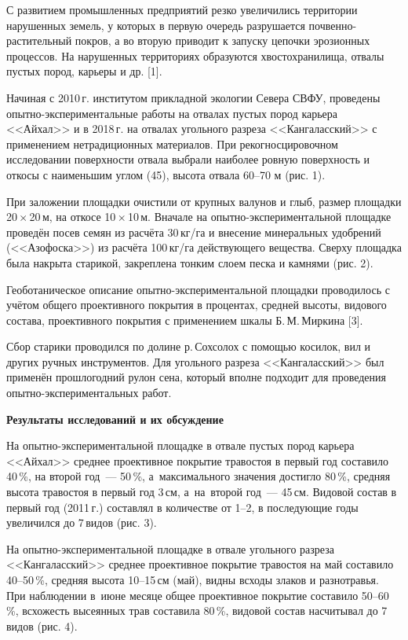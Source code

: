 С развитием промышленных предприятий резко увеличились территории нарушенных земель, у которых в первую очередь разрушается почвенно-растительный покров, а во вторую приводит к запуску цепочки эрозионных процессов. На нарушенных территориях образуются хвостохранилища, отвалы пустых пород, карьеры и др. [1].

Начиная с 2010\,г. институтом прикладной экологии Севера СВФУ, проведены опытно-экспериментальные работы на отвалах пустых пород карьера <<Айхал>> и в 2018\,г. на отвалах угольного разреза <<Кангаласский>> с применением нетрадиционных материалов. При рекогносцировочном исследовании поверхности отвала выбрали наиболее ровную поверхность и откосы с наименьшим углом (45\dg), высота отвала 60--70 м (рис. 1).

При заложении площадки очистили от крупных валунов и глыб, размер площадки 20\,$\times$\,20\,м, на откосе 10\,$\times$\,10\,м. Вначале на опытно-экс\-пе\-ри\-мен\-таль\-ной площадке проведён посев семян из расчёта 30\,кг/га и внесение минеральных удобрений (<<Азофоска>>) из расчёта 100\,кг/га действующего вещества. Сверху площадка была накрыта старикой, закреплена тонким слоем песка и камнями (рис. 2).

Геоботаническое описание опытно-экспериментальной площадки проводилось с учётом общего проективного покрытия в процентах, средней высоты, видового состава, проективного покрытия с применением шкалы Б.\,М.\,Миркина [3].

Сбор старики проводился по долине р.\,Сохсолох с помощью косилок, вил и других ручных инструментов. Для угольного разреза <<Кангаласский>> был применён прошлогодний рулон сена, который вполне подходит для проведения опытно-экспериментальных работ.

\textbf{Результаты исследований и их обсуждение}

На опытно-экспериментальной площадке в отвале пустых пород карьера <<Айхал>> среднее проективное покрытие травостоя в первый год составило 40\,\%, на второй год~--- 50\,\%, а~максимального значения достигло 80\,\%, средняя высота травостоя в первый год 3\,см, а~на~второй год~--- 45\,см. Видовой состав в первый год (2011\,г.) составлял в количестве от 1--2, в последующие годы увеличился до 7\,видов (рис. 3).





На опытно-экспериментальной площадке в отвале угольного разреза <<Кангаласский>> среднее проективное покрытие травостоя на май составило 40--50\,\%, средняя высота 10--15\,см (май), видны всходы злаков и разнотравья. При наблюдении в~июне месяце общее проективное покрытие составило 50--60\,\%, всхожесть высеянных трав составила 80\,\%, видовой состав насчитывал до 7 видов (рис. 4).

